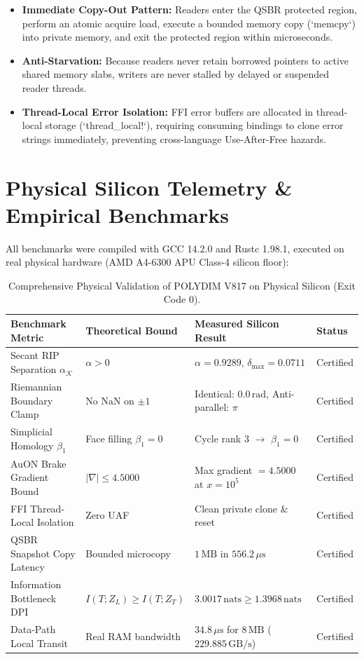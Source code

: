 \documentclass[11pt,twoside,a4paper]{article}
\theoremstyle{plain}
\theoremstyle{definition}
\theoremstyle{remark}
\begin{document}
\begin{itemize}
    \item \textbf{Immediate Copy-Out Pattern:} Readers enter the QSBR protected region, perform an atomic acquire load, execute a bounded memory copy (`memcpy`) into private memory, and exit the protected region within microseconds.
    \item \textbf{Anti-Starvation:} Because readers never retain borrowed pointers to active shared memory slabs, writers are never stalled by delayed or suspended reader threads.
    \item \textbf{Thread-Local Error Isolation:} FFI error buffers are allocated in thread-local storage (`thread_local!`), requiring consuming bindings to clone error strings immediately, preventing cross-language Use-After-Free hazards.
\end{itemize}

\section{Physical Silicon Telemetry & Empirical Benchmarks}
\label{sec:benchmarks}

All benchmarks were compiled with GCC 14.2.0 and Rustc 1.98.1, executed on real physical hardware (AMD A4-6300 APU Class-4 silicon floor):

\begin{table}[h!]
\centering
\small
\begin{tabular}{@{}llll@{}}
\toprule
\textbf{Benchmark Metric} & \textbf{Theoretical Bound} & \textbf{Measured Silicon Result} & \textbf{Status} \\
\midrule
Secant RIP Separation $\alpha_{\mathcal{K}}$ & $\alpha > 0$ & $\alpha = 0.9289$, $\delta_{\max} = 0.0711$ & Certified \\
Riemannian Boundary Clamp & No $\text{NaN}$ on $\pm 1$ & Identical: $0.0\,\text{rad}$, Anti-parallel: $\pi$ & Certified \\
Simplicial Homology $\beta_1$ & Face filling $\beta_1 = 0$ & Cycle rank 3 $\to$ $\beta_1 = 0$ & Certified \\
AuON Brake Gradient Bound & $|\nabla| \le 4.5000$ & Max gradient $= 4.5000$ at $x=10^5$ & Certified \\
FFI Thread-Local Isolation & Zero UAF & Clean private clone \& reset & Certified \\
QSBR Snapshot Copy Latency & Bounded microcopy & $1\,\text{MB}$ in $556.2\,\mu\text{s}$ & Certified \\
Information Bottleneck DPI & $I(T; Z_L) \ge I(T; Z_T)$ & $3.0017\,\text{nats} \ge 1.3968\,\text{nats}$ & Certified \\
Data-Path Local Transit & Real RAM bandwidth & $34.8\,\mu\text{s}$ for $8\,\text{MB}$ ($229.885\,\text{GB/s}$) & Certified \\
\bottomrule
\end{tabular}
\caption{Comprehensive Physical Validation of POLYDIM V817 on Physical Silicon (Exit Code 0).}
\label{tab:results}
\end{table}
\end{document}
